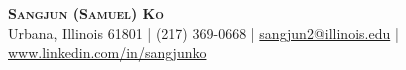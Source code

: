 \documentclass{article}
\begin{document}
\begin{center}
	{\Huge \scshape \textbf{Sangjun (Samuel) Ko}}\\
    Urbana, Illinois 61801 
    | (217) 369-0668 
    | \href{mailto:sangjun2@illinois.edu}{sangjun2@illinois.edu}
    | \href{https://www.linkedin.com/in/sangjunko}{www.linkedin.com/in/sangjunko}
\end{center}
\end{document}
